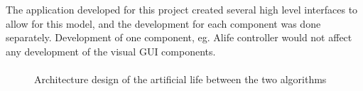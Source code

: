 \documentclass[12pt]{article}
\begin{document}
The application developed for this project created several high level interfaces to allow for this model, and the development for each
component was done separately. Development of one component, eg. Alife controller would not affect any development of the visual 
GUI components.

\paragraph{}


\begin{figure} [ht]
\centering
{}
\caption{Architecture design of the artificial life between the two algorithms}
\label{fig:architectures}
\end{figure}
\end{document}
